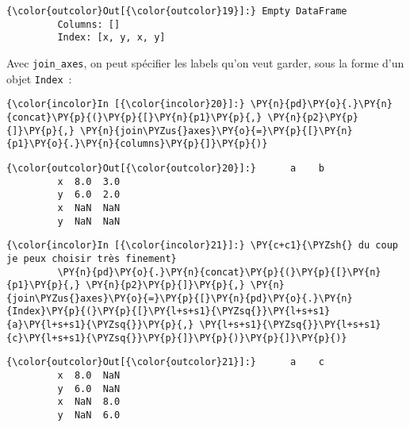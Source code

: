 \begin{Verbatim}[commandchars=\\\{\},frame=single,framerule=0.3mm,rulecolor=\color{cellframecolor}]
{\color{outcolor}Out[{\color{outcolor}19}]:} Empty DataFrame
         Columns: []
         Index: [x, y, x, y]
\end{Verbatim}
            
    Avec \texttt{join\_axes}, on peut spécifier les labels qu'on veut
garder, sous la forme d'un objet \texttt{Index}~:

    \begin{Verbatim}[commandchars=\\\{\},frame=single,framerule=0.3mm,rulecolor=\color{cellframecolor}]
{\color{incolor}In [{\color{incolor}20}]:} \PY{n}{pd}\PY{o}{.}\PY{n}{concat}\PY{p}{(}\PY{p}{[}\PY{n}{p1}\PY{p}{,} \PY{n}{p2}\PY{p}{]}\PY{p}{,} \PY{n}{join\PYZus{}axes}\PY{o}{=}\PY{p}{[}\PY{n}{p1}\PY{o}{.}\PY{n}{columns}\PY{p}{]}\PY{p}{)}
\end{Verbatim}


\begin{Verbatim}[commandchars=\\\{\},frame=single,framerule=0.3mm,rulecolor=\color{cellframecolor}]
{\color{outcolor}Out[{\color{outcolor}20}]:}      a    b
         x  8.0  3.0
         y  6.0  2.0
         x  NaN  NaN
         y  NaN  NaN
\end{Verbatim}
            
    \begin{Verbatim}[commandchars=\\\{\},frame=single,framerule=0.3mm,rulecolor=\color{cellframecolor}]
{\color{incolor}In [{\color{incolor}21}]:} \PY{c+c1}{\PYZsh{} du coup je peux choisir très finement}
         \PY{n}{pd}\PY{o}{.}\PY{n}{concat}\PY{p}{(}\PY{p}{[}\PY{n}{p1}\PY{p}{,} \PY{n}{p2}\PY{p}{]}\PY{p}{,} \PY{n}{join\PYZus{}axes}\PY{o}{=}\PY{p}{[}\PY{n}{pd}\PY{o}{.}\PY{n}{Index}\PY{p}{(}\PY{p}{[}\PY{l+s+s1}{\PYZsq{}}\PY{l+s+s1}{a}\PY{l+s+s1}{\PYZsq{}}\PY{p}{,} \PY{l+s+s1}{\PYZsq{}}\PY{l+s+s1}{c}\PY{l+s+s1}{\PYZsq{}}\PY{p}{]}\PY{p}{)}\PY{p}{]}\PY{p}{)}
\end{Verbatim}


\begin{Verbatim}[commandchars=\\\{\},frame=single,framerule=0.3mm,rulecolor=\color{cellframecolor}]
{\color{outcolor}Out[{\color{outcolor}21}]:}      a    c
         x  8.0  NaN
         y  6.0  NaN
         x  NaN  8.0
         y  NaN  6.0
\end{Verbatim}
            
